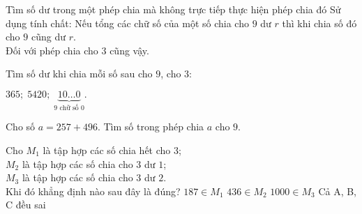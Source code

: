 \begin{dang}{Tìm số dư trong một phép chia mà không trực tiếp thực hiện phép chia đó}
	Sử dụng tính chất: Nếu tổng các chữ số của một số chia cho $9$ dư $r$ thì khi chia số đó cho $9$ cũng dư $r$.\\
	Đối với phép chia cho $3$ cũng vậy.
\end{dang}
\setcounter{vd}{0}
\begin{vd}%
	Tìm số dư khi chia mỗi số sau cho $9$, cho $3$:\begin{center}
		$365;\; 5420;\; \underbrace{{10\ldots0}}_{\text{$9$ chữ số $0$}}.$
	\end{center}
\end{vd}
\begin{vd}%
	Cho số $a=257+496$. Tìm số trong phép chia $a$ cho $9$.
\end{vd}
\begin{vd}%
	Cho $M_1$ là tập hợp các số chia hết cho $3$;\\
	$M_2$ là tập hợp các số chia cho $3$ dư $1$;\\
	$M_3$ là tập hợp các số chia cho $3$ dư $2$.\\
	Khi đó khẳng  định nào sau đây là đúng?
	\choice
	{$187\in M_1$}
	{\True $436\in M_2$}
	{$1000\in M_3$}
	{Cả A, B, C đều sai}
\end{vd}
